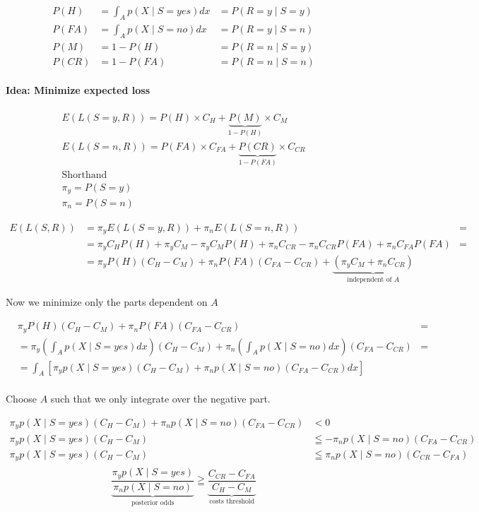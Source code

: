 \documentclass[../main/Notes.tex]{subfiles}
\begin{document}
\begin{align}
P(H) &= \int_A p(X \mid S=yes)dx &= P(R=y \mid S=y) \\
P(FA) &= \int_A p(X \mid S=no)dx &= P(R=y \mid S=n) \\
P(M)  &= 1 - P(H) &= P(R=n \mid S=y)\\
P(CR) &= 1 - P(FA) &= P(R=n \mid S=n)
\end{align}

\paragraph{Idea: Minimize expected loss }

\begin{gather*}
E(L(S=y,R)) = P(H) \times C_H +  \underbrace{P(M)}_{1-P(H)} \times C_M \\
E(L(S=n,R)) = P(FA) \times C_{FA} +  \underbrace{P(CR)}_{1-P(FA)} \times C_{CR} \\
\text{Shorthand} \\
\pi_y = P(S=y) \\
\pi_n = P(S=n)
\end{gather*}

\begin{align*}
E(L(S,R)) &= \pi_y  E(L(S=y, R)) + \pi_n E(L(S=n, R)) &= \\
&= \pi_y C_H  P(H) + \pi_y C_M - \pi_y C_M P(H) + \pi_n C_{CR} - \pi_n C_{CR} P(FA) + \pi_n C_{FA} P(FA) &= \\
&= \pi_y P(H) (C_H - C_M) + \pi_n P(FA) (C_{FA} - C_{CR}) + \underbrace{(\pi_y C_M + \pi_n C_{CR})}_{\text{independent of } A} &
\end{align*}

Now we minimize only the parts dependent on $A$

\begin{align*}
& \pi_y P(H) (C_H - C_M) + \pi_n P(FA) (C_{FA} - C_{CR}) &= \\
&= \pi_y (\int_A p(X \mid S=yes) dx)(C_H - C_M) + \pi_n (\int_A p(X \mid S=no) dx) (C_{FA} - C_{CR}) &= \\
&= \int_A [\pi_y p(X \mid S=yes)(C_H - C_M) + \pi_n p(X \mid S=no)(C_{FA} - C_{CR}) dx] & \\
\end{align*}

Choose $A$ such that we only integrate over the negative part.

\begin{align*}
\pi_y p(X \mid S=yes)(C_H - C_M) + \pi_n p(X \mid S=no)(C_{FA} - C_{CR}) &< 0 \\
\pi_y p(X \mid S=yes)(C_H - C_M) &\leqq - \pi_n p(X \mid S=no)(C_{FA} - C_{CR}) \\
\pi_y p(X \mid S=yes)(C_H - C_M) &\leqq \pi_n p(X \mid S=no)(C_{CR} - C_{FA}) \\
\end{align*}
\begin{equation}
\underbrace{\frac{\pi_y p(X \mid S=yes)}{\pi_n p(X \mid S=no)}}_\text{posterior odds} \geqq \underbrace{\frac{C_{CR} - C_{FA}}{C_H - C_M}}_\text{costs threshold}
\end{equation}
\end{document}
